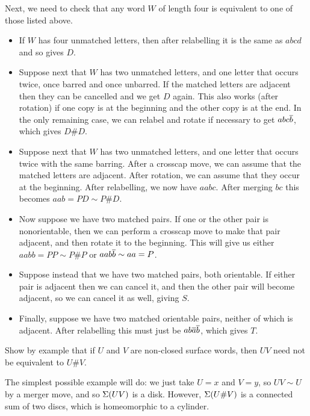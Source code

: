 \documentclass[a4paper]{amsart}
\begin{document}
\begin{solution}
 Next, we need to check that any word $W$ of length four is equivalent
 to one of those listed above.  
 \begin{itemize}
  \item If $W$ has four unmatched letters, then after relabelling it is
   the same as $abcd$ and so gives $D$.
  \item Suppose next that $W$ has two unmatched letters, and one
   letter that occurs twice, once barred and once unbarred.  If the
   matched letters are adjacent then they can be cancelled and we get
   $D$ again.  This also works (after rotation) if one copy is at the
   beginning and the other copy is at the end.  In the only remaining
   case, we can relabel and rotate if necessary to get $abc\overline{b}$, which
   gives $D\# D$.
  \item Suppose next that $W$ has two unmatched letters, and one
   letter that occurs twice with the same barring.  After a crosscap
   move, we can assume that the matched letters are adjacent.  After
   rotation, we can assume that they occur at the beginning.  After
   relabelling, we now have $aabc$.  After merging $bc$ this becomes
   $aab=PD\sim P\# D$.
  \item Now suppose we have two matched pairs.  If one or the other
   pair is nonorientable, then we can perform a crosscap move to make
   that pair adjacent, and then rotate it to the beginning.  This will
   give us either $aabb=PP\sim P\# P$ or $aab\overline{b}\sim aa=P$.  
  \item Suppose instead that we have two matched pairs, both
   orientable.  If either pair is adjacent then we can cancel it, and
   then the other pair will become adjacent, so we can cancel it as
   well, giving $S$.
  \item Finally, suppose we have two matched orientable pairs, neither
   of which is adjacent.  After relabelling this must just be
   $ab\overline{a}\overline{b}$, which gives $T$.
 \end{itemize}
\end{solution}

\begin{exercise}
 Show by example that if $U$ and $V$ are non-closed surface words,
 then $UV$ need not be equivalent to $U\# V$.
\end{exercise}
\begin{solution}
 The simplest possible example will do: we just take $U=x$ and $V=y$,
 so $UV\sim U$ by a merger move, and so $\Sigma(UV)$ is a disk.  However,
 $\Sigma(U\# V)$ is a connected sum of two discs, which is homeomorphic
 to a cylinder.
\end{solution}
\end{document}
